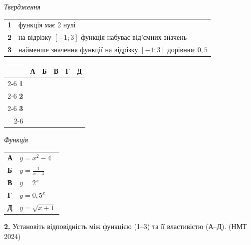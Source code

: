 \documentclass[14pt]{extarticle}
\newcommand{\answerGrid}{
    \begingroup
    \setlength{\tabcolsep}{4pt}
    \renewcommand{\arraystretch}{1.2}
    \small
    \begin{tabular}{r|c|c|c|c|c|}
         \multicolumn{1}{c}{} & \multicolumn{1}{c}{\textbf{А}} & \multicolumn{1}{c}{\textbf{Б}} & \multicolumn{1}{c}{\textbf{В}} & \multicolumn{1}{c}{\textbf{Г}} & \multicolumn{1}{c}{\textbf{Д}} \\ \cline{2-6}
         \textbf{1} & & & & & \\ \cline{2-6}
         \textbf{2} & & & & & \\ \cline{2-6}
         \textbf{3} & & & & & \\ \cline{2-6}
    \end{tabular}
    \endgroup
}
\newcommand{\nmtyear}[1]{\hfill{\small\color{yearcolor}(НМТ #1)}}
\begin{document}
\noindent
\begin{minipage}[t]{0.55\textwidth}
    \textit{Твердження} \par \vspace{0.2cm}
    \begin{tabular}{@{}p{0.5cm} p{8cm}@{}}
    \textbf{1} & функція має 2 нулі \\[0.2cm]
    \textbf{2} & на відрізку $[-1; 3]$ функція набуває від'ємних значень \\[0.2cm]
    \textbf{3} & найменше значення функції на відрізку $[-1; 3]$ дорівнює $0{,}5$ \\
    \end{tabular}
    
    \vspace{0.3cm}
    \answerGrid
\end{minipage}%
\hfill
\begin{minipage}[t]{0.40\textwidth}
    \textit{Функція} \par \vspace{0.2cm}
    \begin{tabular}{@{}p{0.5cm} l@{}}
    \textbf{А} & $y = x^2 - 4$ \\[0.3cm]
    \textbf{Б} & $y = \displaystyle\frac{1}{x - 4}$ \\[0.5cm]
    \textbf{В} & \colorbox{yellow!30}{$y = 2^x$} \\[0.3cm]
    \textbf{Г} & \colorbox{yellow!30}{$y = 0{,}5^x$} \\[0.3cm]
    \textbf{Д} & $y = \sqrt{x + 1}$ \\
    \end{tabular}
\end{minipage}
\vspace{0.7cm}

\noindent\textbf{2.} Установіть відповідність між функцією (1–3) та її властивістю (А–Д). \nmtyear{2024}
\vspace{0.3cm}
\end{document}
